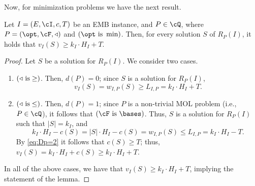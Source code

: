Now, for minimization problems we have the next result. 
	\begin{lemma}
	\label{lem:OptMinBound}
	Let $I =(E,\cI,c,T)$ be an \textnormal{EMB} instance, and $P \in \cQ$, where $P = (\opt,\cF,\triangleleft)$ and $\left(\opt \textnormal{ is } \min\right)$. Then, for every solution $S$ of $R_P(I)$, it holds that $v_I(S) \geq k_I \cdot H_I+T$.  %
\end{lemma}

\begin{proof}
	Let $S$ be a solution for $R_P(I)$. We consider two cases. 
	\begin{enumerate}
		\item $(\triangleleft \textnormal{ is}   \geq)$. Then, $d(P) = 0$; since $S$ is a solution for $R_P(I)$, $$v_I(S) = w_{I,P}(S) \geq L_{I,P} = k_I \cdot H_I+T.$$ 
		\item  $(\triangleleft \textnormal{ is}   \leq)$. Then, $d(P) = 1$; since $P$ is a non-trivial MOL problem (i.e., $P \in \cQ$), it follows that $\left(\cF \textnormal{ is } \bases\right)$. Thus, $S$ is a solution for $R_P(I)$ such that $|S| = k_I$, and
		\begin{equation}
			\label{eq:Dp=2}
			 	  k_I \cdot H_I-c(S)= |S| \cdot H_I-c(S) =w_{I,P}(S) \leq L_{I,P} = k_I \cdot H_I-T.
		\end{equation} 
		By \eqref{eq:Dp=2} it follows that $c(S) \geq T$; thus, $v_I(S) = k_I \cdot H_I+c(S) \geq k_I \cdot H_I+T$. 
	\end{enumerate}
In all of the above cases, we have that $v_I(S) \geq k_I \cdot H_I+T$, implying the statement of the lemma. 
\end{proof}


